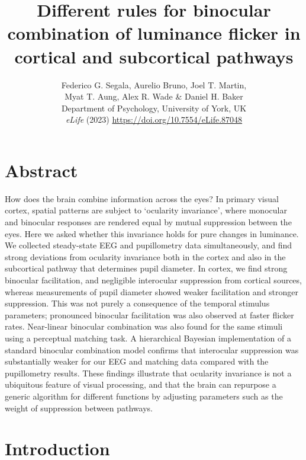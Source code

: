 \documentclass[
]{article}
\title{Different rules for binocular combination of luminance flicker in cortical and subcortical pathways}
\author{Federico G. Segala, Aurelio Bruno, Joel T. Martin,\\
Myat T. Aung, Alex R. Wade \& Daniel H. Baker\\
Department of Psychology, University of York, UK\\
\emph{eLife} (2023) \url{https://doi.org/10.7554/eLife.87048}}
\date{}
\begin{document}
\maketitle

\hypertarget{abstract}{%
\section{Abstract}\label{abstract}}

How does the brain combine information across the eyes? In primary visual cortex, spatial patterns are subject to `ocularity invariance', where monocular and binocular responses are rendered equal by mutual suppression between the eyes. Here we asked whether this invariance holds for pure changes in luminance. We collected steady-state EEG and pupillometry data simultaneously, and find strong deviations from ocularity invariance both in the cortex and also in the subcortical pathway that determines pupil diameter. In cortex, we find strong binocular facilitation, and negligible interocular suppression from cortical sources, whereas measurements of pupil diameter showed weaker facilitation and stronger suppression. This was not purely a consequence of the temporal stimulus parameters; pronounced binocular facilitation was also observed at faster flicker rates. Near-linear binocular combination was also found for the same stimuli using a perceptual matching task. A hierarchical Bayesian implementation of a standard binocular combination model confirms that interocular suppression was substantially weaker for our EEG and matching data compared with the pupillometry results. These findings illustrate that ocularity invariance is not a ubiquitous feature of visual processing, and that the brain can repurpose a generic algorithm for different functions by adjusting parameters such as the weight of suppression between pathways.

\hypertarget{introduction}{%
\section{Introduction}\label{introduction}}
\end{document}
